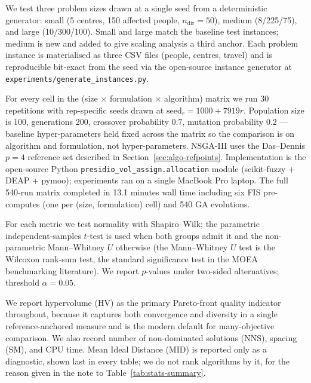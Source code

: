 \documentclass[applsci,article,submit,moreauthors,pdftex]{Definitions/mdpi}
\begin{document}
We test three problem sizes drawn at a single seed from a deterministic
generator: small (5 centres, 150 affected people, $n_{\mathrm{dir}} = 50$),
medium (8/225/75), and large (10/300/100). Small and large match the baseline
test instances; medium is new and added to give scaling
analysis a third anchor. Each problem instance is materialised as three CSV
files (people, centres, travel) and is reproducible bit-exact from the seed
via the open-source instance generator at
\texttt{experiments/generate\_instances.py}.

For every cell in the (size $\times$ formulation $\times$ algorithm) matrix
we run 30 repetitions with rep-specific seeds drawn at
$\mathrm{seed}_r = 1000 + 7919 r$. Population size is 100, generations 200,
crossover probability $0.7$, mutation probability $0.2$ --- baseline
hyper-parameters held fixed across the matrix so the comparison is on
algorithm and formulation, not hyper-parameters. NSGA-III uses the
Das--Dennis $p = 4$ reference set described in
Section~\ref{sec:algo-refpoints}. Implementation is the open-source Python
\texttt{presidio\_vol\_assign.allocation} module
(scikit-fuzzy + DEAP + pymoo); experiments ran on a single MacBook Pro
laptop. The full 540-run matrix completed in 13.1 minutes wall time
including six FIS pre-computes (one per (size, formulation) cell) and
540 GA evolutions.

For each metric we test normality with Shapiro--Wilk; the parametric
independent-samples $t$-test is used when both groups admit it and the
non-parametric Mann--Whitney $U$ otherwise (the Mann--Whitney $U$ test is
the Wilcoxon rank-sum test, the standard significance test in the MOEA
benchmarking literature). We report $p$-values under
two-sided alternatives; threshold $\alpha = 0.05$.

We report hypervolume (HV) as the primary Pareto-front quality indicator
throughout, because it captures both convergence and diversity in a single
reference-anchored measure and is the modern default for many-objective
comparison. We also record number of non-dominated solutions (NNS), spacing
(SM), and CPU time. Mean Ideal Distance (MID) is reported only as a diagnostic,
shown last in every table; we do not rank algorithms by it, for the reason
given in the note to Table~\ref{tab:stats-summary}.
\end{document}

